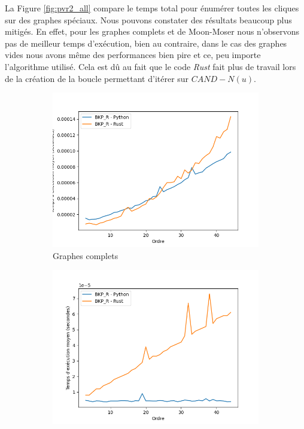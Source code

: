\documentclass[12pt,a4paper]{article}
\begin{document}
La Figure \ref{fig:pvr2_all} compare le temps total pour énumérer toutes les cliques sur des graphes spéciaux. Nous pouvons constater des résultats beaucoup plus mitigés. En effet, pour les graphes complets et de Moon-Moser nous n'observons pas de meilleur temps d'exécution, bien au contraire, dans le cas des graphes vides nous avons même des performances bien pire et ce, peu importe l'algorithme utilisé. Cela est dû au fait que le code \emph{Rust} fait plus de travail lors de la création de la boucle permettant d'itérer sur \(CAND - N(u)\).

\begin{figure}[h!]
  \centering
  \begin{subfigure}[b]{0.32\textwidth}
    \includegraphics[width=\textwidth]{images/total_BKP_R_new_pyrust_pivot_complete_plot.png}
  \caption{Graphes complets}%
  \label{subfig:pr2_BKP_R_complete}
  \end{subfigure}
  \begin{subfigure}[b]{0.32\textwidth}
    \includegraphics[width=\textwidth]{images/total_BKP_R_new_pyrust_pivot_empty_plot.png}

\end{subfigure}
\end{figure}
\end{document}
